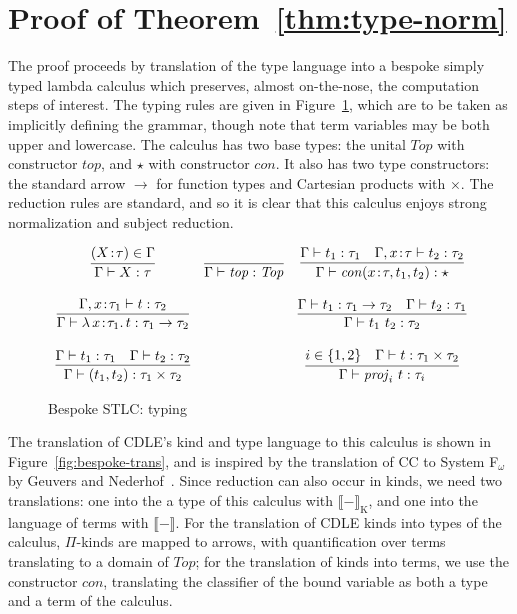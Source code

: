 \documentclass{article}
\newcommand{\abs}[4]{{#1}\, #2\! : \! #3.\, #4}
\newcommand{\interp}[1]{\llbracket #1 \rrbracket}
\begin{document}
\section{Proof of Theorem~\ref{thm:type-norm}}
The proof proceeds by translation of the type language into a bespoke simply
typed lambda calculus which preserves, almost on-the-nose, the computation steps of
interest.
The typing rules are given in Figure~\ref{fig:bespoke-stlc}, which are to be
taken as implicitly defining the grammar, though note that term variables may be
both upper and lowercase.
The calculus has two base types: the unital \(\mathit{Top}\) with constructor
\(\mathit{top}\), and \(\mathit{\star}\) with constructor \(\mathit{con}\).
It also has two type constructors: the standard arrow \(\to\) for function types
and Cartesian products with \(\times\).
The reduction rules are standard, and so it is clear that this calculus enjoys
strong normalization and subject reduction.

\begin{figure}
  \[
    \begin{array}{ccc}
      \infer{
       \Gamma \vdash X : \tau
      }{
       (X\!:\!\tau) \in \Gamma
      }
      &
        \infer{
         \Gamma \vdash \mathit{top} : \mathit{Top}
        }{}
      &
        \infer{
         \Gamma \vdash \mathit{con}(x\!:\!\tau,t_1,t_2) : \star
        }{
         \Gamma \vdash t_1 : \tau_1
         \quad \Gamma,x\!:\!\tau \vdash t_2 : \tau_2
        }
      \\ \\
      \infer{
       \Gamma \vdash \abs{\lambda}{x}{\tau_1}{t} : \tau_1 \to \tau_2
      }{
       \Gamma, x\!:\!\tau_1 \vdash t : \tau_2
      }
      & &
        \infer{
         \Gamma \vdash t_1\ t_2 : \tau_2
        }{
         \Gamma \vdash t_1 : \tau_1 \to \tau_2
         \quad \Gamma \vdash t_2 : \tau_1
        }
      \\ \\
      \infer{
       \Gamma \vdash (t_1,t_2) : \tau_1 \times \tau_2
      }{
       \Gamma \vdash t_1 : \tau_1
       \quad \Gamma \vdash t_2 : \tau_2
      }
      & &
        \infer{
         \Gamma \vdash \mathit{proj}_i\ t : \tau_i
        }{
         i \in \{1,2\}
         \quad \Gamma \vdash t : \tau_1 \times \tau_2
        }
    \end{array}
  \]
  \caption{Bespoke STLC: typing}
  \label{fig:bespoke-stlc}
\end{figure}

The translation of CDLE's kind and type language to this calculus is shown in
Figure~\ref{fig:bespoke-trans}, and is inspired by the translation of CC to
System F\(_\omega\) by Geuvers and
Nederhof~\cite{GN91_Modular-Proof-of-Strong-Normalization-CC}.
Since reduction can also occur in kinds, we need two translations: one
into the a type of this calculus with \(\interp{-}_{\text{K}}\), and one into
the language of terms with \(\interp{-}\).
For the translation of CDLE kinds into types of the calculus, \(\Pi\)-kinds are
mapped to arrows, with quantification over terms translating to a domain of
\(\mathit{Top}\); for the translation of kinds into terms, we use the
constructor \(\mathit{con}\), translating the classifier of the bound variable
as both a type and a term of the calculus.
\end{document}
